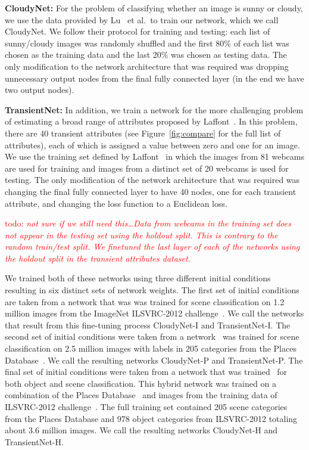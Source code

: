 \documentclass{article}
\newcommand{\todo}[1]{\textcolor{red}{todo: {\em #1}}}
\newcommand{\figref}[1]{Figure~\ref{fig:#1}}
\begin{document}
\textbf{CloudyNet:} For the problem of classifying whether an image is
sunny or cloudy, we use the data provided by Lu~\cite{lutwoclass} et
al.\ to train our network, which we call CloudyNet.  We follow their
protocol for training and testing: each list of sunny/cloudy images
was randomly shuffled and the first 80\% of each list was chosen as
the training data and the last 20\% was chosen as testing data.  The
only modification to the network architecture that was required was
dropping unnecessary output nodes from the final fully connected layer
(in the end we have two output nodes).

\textbf{TransientNet:} In addition, we train a network for the more
challenging problem of estimating a broad range of attributes proposed
by Laffont~\cite{Laffont14}.  In this problem, there are 40 transient
attributes (see \figref{compare} for the full list of
attributes), each of which is assigned a value between zero and one
for an image. We use the training set defined by
Laffont~\cite{Laffont14} in which the images from 81 webcams are used
for training and images from a distinct set of 20 webcams is used for
testing.  The only modification of the network architecture that was
required was changing the final fully connected layer to have 40
nodes, one for each transient attribute, and changing the loss
function to a Euclidean loss. 

\todo{not sure if we still need this\dots Data from webcams in the
training set does not appear in the testing set using the holdout
split.  This is contrary to the random train/test split.  We finetuned
the last layer of each of the networks using the holdout split in the
transient attributes dataset.}

We trained both of these networks using three different initial
conditions resulting in six distinct sets of network weights. The
first set of initial conditions are taken from a network that was was
trained for scene classification on 1.2 million images from the
ImageNet ILSVRC-2012 challenge~\cite{ILSVRCarxiv14}.  We call the
networks that result from this fine-tuning process CloudyNet-I and
TransientNet-I.  The second set of initial conditions were taken from
a network~\cite{zhou2014places} was trained for scene classification
on 2.5 million images with labels in 205 categories from the Places
Database~\cite{zhou2014places}. We call the resulting networks
CloudyNet-P and TransientNet-P.  The final set of initial conditions
were taken from a network that was trained~\cite{zhou2014places} for
both object and scene classification.  This hybrid network was trained
on a combination of the Places Database~\cite{zhou2014places} and
images from the training data of ILSVRC-2012
challenge~\cite{ILSVRCarxiv14}.  The full training set contained 205
scene categories from the Places Database and 978 object categories
from ILSVRC-2012 totaling about 3.6 million images.  We call the
resulting networks CloudyNet-H and TransientNet-H.
\end{document}
